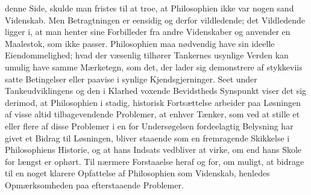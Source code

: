 \documentclass[12pt]{article}
\begin{document}
denne Side, skulde man fristes til at troe, at Philosophien
ikke var nogen sand Videnskab. Men Betragtningen er eensidig
og derfor vildledende; det Vildledende ligger i, at man henter
sine Forbilleder fra andre Videnskaber og anvender en
Maalestok, som ikke passer. Philosophien maa nødvendig have
sin ideelle Eiendommelighed; hvad der væsenlig tilhører
Tankernes usynlige Verden kan umulig have samme Mærketegn,
som det, der lader sig demonstrere af stykkeviis satte
Betingelser eller paavise i synlige Kjendsgjerninger. Seet
under Tankeudviklingens og den i Klarhed voxende Bevidstheds
Synspunkt viser det sig derimod, at Philosophien i stadig,
historisk Fortsættelse arbeider paa Løsningen af visse altid
tilbagevendende Problemer, at enhver Tænker, som ved at stille
et eller flere af disse Problemer i en for Undersøgelsen
fordeelagtig Belysning har givet et Bidrag til Løsningen,
bliver staaende som en fremragende Skikkelse i Philosophiens
Historie, og at hans Indsats vedbliver at virke, om end hans
Skole for længst er ophørt. Til nærmere Forstaaelse heraf og
for, om muligt, at bidrage til en noget klarere Opfattelse af
Philosophien som Videnskab, henledes Opmærksomheden paa
efterstaaende Problemer.


\end{document}
